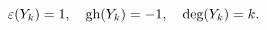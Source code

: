 \begin{equation}\label{4.28}
\varepsilon(Y_k)=1,\quad \hbox{gh}(Y_k)=-1,\quad \hbox{deg}(Y_k)=k.
\end{equation}


